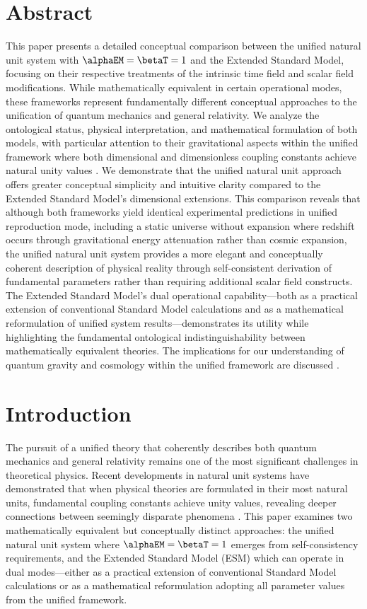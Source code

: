 \section*{Abstract}
	This paper presents a detailed conceptual comparison between the unified natural unit system with $\alphaEM = \betaT = 1$ and the Extended Standard Model, focusing on their respective treatments of the intrinsic time field and scalar field modifications. While mathematically equivalent in certain operational modes, these frameworks represent fundamentally different conceptual approaches to the unification of quantum mechanics and general relativity. We analyze the ontological status, physical interpretation, and mathematical formulation of both models, with particular attention to their gravitational aspects within the unified framework where both dimensional and dimensionless coupling constants achieve natural unity values \cite{pascher_unified_2025}. We demonstrate that the unified natural unit approach offers greater conceptual simplicity and intuitive clarity compared to the Extended Standard Model's dimensional extensions. This comparison reveals that although both frameworks yield identical experimental predictions in unified reproduction mode, including a static universe without expansion where redshift occurs through gravitational energy attenuation rather than cosmic expansion, the unified natural unit system provides a more elegant and conceptually coherent description of physical reality through self-consistent derivation of fundamental parameters rather than requiring additional scalar field constructs. The Extended Standard Model's dual operational capability—both as a practical extension of conventional Standard Model calculations and as a mathematical reformulation of unified system results—demonstrates its utility while highlighting the fundamental ontological indistinguishability between mathematically equivalent theories. The implications for our understanding of quantum gravity and cosmology within the unified framework are discussed \cite{pascher_lagrangian_2025,pascher_beta_derivation_2025}.
	
	\section{Introduction}
	\label{sec:introduction}
	
	The pursuit of a unified theory that coherently describes both quantum mechanics and general relativity remains one of the most significant challenges in theoretical physics. Recent developments in natural unit systems have demonstrated that when physical theories are formulated in their most natural units, fundamental coupling constants achieve unity values, revealing deeper connections between seemingly disparate phenomena \cite{pascher_unified_2025}. This paper examines two mathematically equivalent but conceptually distinct approaches: the unified natural unit system where $\alphaEM = \betaT = 1$ emerges from self-consistency requirements, and the Extended Standard Model (ESM) which can operate in dual modes—either as a practical extension of conventional Standard Model calculations or as a mathematical reformulation adopting all parameter values from the unified framework.
	
